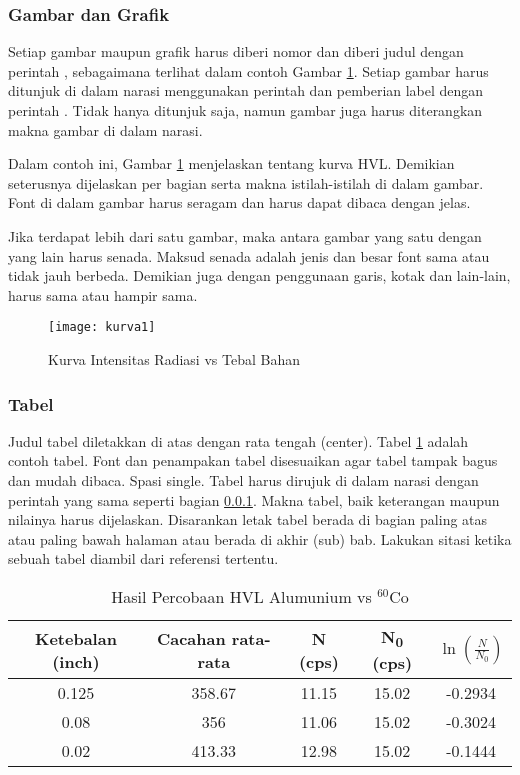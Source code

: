 \subsubsection{Gambar dan Grafik} \label{gambar}
Setiap gambar maupun grafik harus diberi nomor dan diberi judul dengan perintah , sebagaimana terlihat dalam contoh Gambar \ref{contohgambar}. Setiap gambar harus ditunjuk di dalam narasi menggunakan perintah  dan pemberian label dengan perintah . Tidak hanya ditunjuk saja, namun gambar juga harus diterangkan makna gambar di dalam narasi.

Dalam contoh ini, Gambar \ref{contohgambar} menjelaskan tentang kurva HVL. Demikian seterusnya dijelaskan per bagian serta makna istilah-istilah di dalam gambar. Font di dalam gambar harus seragam dan harus dapat dibaca dengan jelas. 

Jika terdapat lebih dari satu gambar, maka antara gambar yang satu dengan yang lain harus senada. Maksud senada adalah jenis dan besar font sama atau tidak jauh berbeda. Demikian juga dengan penggunaan garis, kotak dan lain-lain, harus sama atau hampir sama.

\begin{figure}
	\centering
	\texttt{[image: kurva1]}
	\caption{Kurva Intensitas Radiasi vs Tebal Bahan}
	\label{contohgambar}
\end{figure}

\subsubsection{Tabel}
Judul tabel diletakkan di atas dengan rata tengah (center). Tabel \ref{contohtabel} adalah contoh tabel. Font dan penampakan tabel disesuaikan agar tabel tampak bagus dan mudah dibaca. Spasi single. Tabel harus dirujuk di dalam narasi dengan perintah yang sama seperti bagian \ref{gambar}. Makna tabel, baik keterangan maupun nilainya harus dijelaskan. Disarankan letak tabel berada di bagian paling atas atau paling bawah halaman atau berada di akhir (sub) bab. Lakukan sitasi ketika sebuah tabel diambil dari referensi tertentu. 

\begin{table}[!htb]
	\begin{center}
		\caption[Contoh HVL]{Hasil Percobaan HVL Alumunium vs $^{60}$Co}
		\label{contohtabel}
		\begin{tabular}{ccccc}
			\hline
			Ketebalan (inch) & Cacahan rata-rata & N (cps) & N\textsubscript{0} (cps) & $\ln\left(\frac{N}{N_0}\right)$\\
			\hline
			0.125 & 358.67 & 11.15 & 15.02 & -0.2934\\
			0.08 & 356 & 11.06 & 15.02 & -0.3024\\
			0.02 & 413.33 & 12.98 & 15.02 & -0.1444\\
			\hline
		\end{tabular}
	\end{center}
\end{table}

